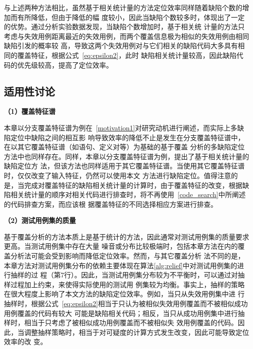 与上述两种方法相比，虽然基于相关统计量的方法定位效率同样随着缺陷个数的增加而有所降低，但由于降低的幅
度较小，因此当缺陷个数较多时，体现出了一定的优势。通过分析实验数据发现，当缺陷个数增加时，基于相关统
计量的方法只考虑与失效用例距离最近的失效用例，而两个覆盖信息极为相似的失效用例由相同缺陷引发的概率较
高，导致这两个失效用例对与它们相关的缺陷代码大多具有相同的覆盖特征，根据公式~\ref{eq:epsilon2}，此时
缺陷相关统计量较高，因此缺陷代码的优先级较高，提高了定位效率。

\subsection{适用性讨论}

\textbf{（1）覆盖特征谱}

本章以分支覆盖特征谱为例在~\ref{motivation1}对研究动机进行阐述，而实际上多缺陷定位中缺陷之间的相互影
响导致效率的降低不止是发生在分支覆盖特征谱中，在以其它覆盖特征谱（如语句、定义对等）为基础的基于覆盖
分析的多缺陷定位方法中也同样存在。同样，本章以分支覆盖特征谱为例，提出了基于相关统计量的缺陷定位方
法，但该方法也同样适用于其它覆盖特征谱。当使用其它覆盖特征谱时，仅仅改变了输入特征，仍然可以使用本文
方法进行缺陷定位。值得注意的是，当完成对覆盖特征的缺陷相关统计量的计算时，由于覆盖特征的改变，根据缺
陷相关统计量的顺序对相关代码进行排查时，将不再使用~\ref{code_search}中所阐述的代码排查方案，而应该根
据覆盖特征的不同选择相应方案进行排查。

\textbf{（2）测试用例集的质量}

基于覆盖分析的方法本质上是基于统计的方法，因此通常对测试用例集的质量要求更高。当测试用例集中存在大量
噪音或分布比较极端时，包括本章方法在内的覆盖分析法可能会受到影响而降低定位效率。然而，与其它覆盖分析
法不同的是，本章方法对测试用例集分布的依赖主要体现在算法\ref{alg:relief}中对测试用例集的进行抽样的过
程（第7行）。因此，当测试用例集分布较为不平衡时，可以通过对抽样过程加上约束，来使得实际使用的测试用
例集较为均衡。事实上，抽样的策略在很大程度上影响了本文方法的缺陷定位效率。例如，当只从失效用例集中进
行抽样时，根据公式~\ref{eq:epsilon2}相当于只认为被相似失效用例覆盖而不被相似成功用例覆盖的代码有较大
可能是缺陷相关代码；相反，当只从成功用例集中进行抽样时，相当于只考虑了被相似成功用例覆盖而不被相似失
效用例覆盖的代码。因此，当调整抽样策略时，相当于对可疑度的计算方式发生改变，因此可能导致定位效率的改
变。

